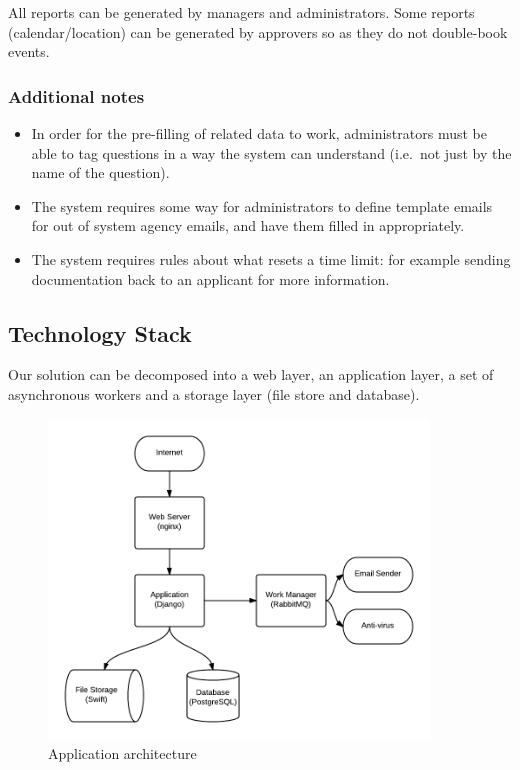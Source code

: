 \documentclass[12pt,a4paper,twosided]{article}
\begin{document}
All reports can be generated by managers and administrators. Some
reports (calendar/location) can be generated by approvers so as they do
not double-book events.

\subsubsection{Additional notes}

\begin{itemize}
\item
  In order for the pre-filling of related data to work, administrators
  must be able to tag questions in a way the system can understand
  (i.e.~not just by the name of the question).
\item
  The system requires some way for administrators to define template
  emails for out of system agency emails, and have them filled in
  appropriately.
\item
  The system requires rules about what resets a time limit: for example
  sending documentation back to an applicant for more information.
\end{itemize}

\subsection{Technology Stack}

Our solution can be decomposed into a web layer, an application layer, a
set of asynchronous workers and a storage layer (file store and
database).

\begin{figure}[htbp]
\centering
\includegraphics[width=0.9\textwidth]{./imgs/tech-overview.png}
\caption{Application architecture}
\end{figure}
\end{document}
